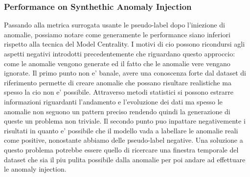 \subsubsection{Performance on Synthethic Anomaly Injection}
Passando alla metrica surrogata usante le pseudo-label dopo l'iniezione di anomalie, possiamo notare come generamente le performance siano inferiori rispetto alla tecnica del Model Centrality. I motivi di cio possono ricondursi agli aspetti negativi introdotti precedentemente che riguardano questo approccio: come le anomalie vengono generate ed il fatto che le anomalie vere vengano ignorate. Il primo punto non e' banale, avere una conoscenza forte dal dataset di riferimento permette di creare anomalie che possano risultare realistiche ma spesso la cio non e' possibile. Attraverso metodi statistici si possono estrarre informazioni riguardanti l'andamento e l'evoluzione dei dati ma spesso le anomalie non seguono un pattern preciso rendendo quindi la generazione di queste un problema non triviale. Il secondo punto puo inpattare negativemente i risultati in quanto e' possibile che il modello vada a labellare le anomalie reali come positive, nonostante abbiamo delle pseudo-label negative. Una soluzione a questo problema potrebbe essere quello di ricercare una finestra temporale del dataset che sia il piu pulita possibile dalla anomalie per poi andare ad effettuare le anomaly injection.
